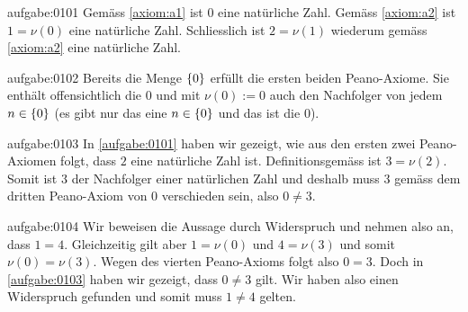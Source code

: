 \begin{antwort}{aufgabe:0101}
Gemäss \cref{axiom:a1} ist $0$ eine natürliche Zahl. Gemäss \cref{axiom:a2} ist $1=\nu(0)$ eine natürliche Zahl. Schliesslich ist $2=\nu(1)$ wiederum gemäss \cref{axiom:a2} eine natürliche Zahl.
\end{antwort}



\begin{antwort}{aufgabe:0102}
Bereits die Menge $\left\{0\right\}$ erfüllt die ersten beiden Peano-Axiome. Sie enthält offensichtlich die $0$ und mit $\nu(0):=0$ auch den Nachfolger von jedem $n\in\left\{0\right\}$ (es gibt nur das eine $n\in\left\{0\right\}$ und das ist die $0$).
\end{antwort}



\begin{antwort}{aufgabe:0103}
In \cref{aufgabe:0101} haben wir gezeigt, wie aus den ersten zwei Peano-Axiomen folgt, dass $2$ eine natürliche Zahl ist. Definitionsgemäss ist $3=\nu(2)$. Somit ist $3$ der Nachfolger einer natürlichen Zahl und deshalb muss $3$ gemäss dem dritten Peano-Axiom von $0$ verschieden sein, also $0\neq 3$.
\end{antwort}



\begin{antwort}{aufgabe:0104}
Wir beweisen die Aussage durch Widerspruch und nehmen also an, dass $1=4$. Gleichzeitig gilt aber $1=\nu(0)$ und $4=\nu(3)$ und somit $\nu(0)=\nu(3)$. Wegen des vierten Peano-Axioms folgt also $0=3$. Doch in \cref{aufgabe:0103} haben wir gezeigt, dass $0\neq 3$ gilt. Wir haben also einen Widerspruch gefunden und somit muss $1\neq 4$ gelten.
\end{antwort}



